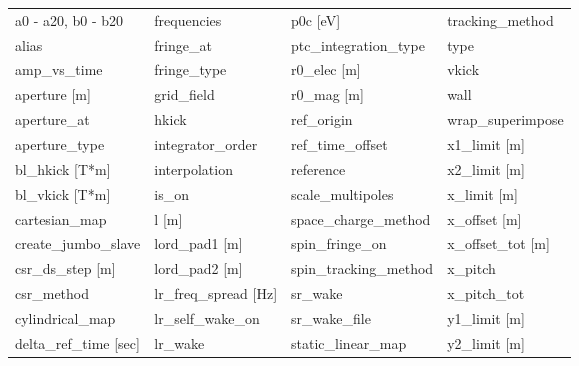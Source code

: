  \begin{tabular}{llll} \toprule
a0 - a20, b0 - b20               & frequencies                      & p0c [eV]                         & tracking_method                  \\
alias                            & fringe_at                        & ptc_integration_type             & type                             \\
amp_vs_time                      & fringe_type                      & r0_elec [m]                      & vkick                            \\
aperture [m]                     & grid_field                       & r0_mag [m]                       & wall                             \\
aperture_at                      & hkick                            & ref_origin                       & wrap_superimpose                 \\
aperture_type                    & integrator_order                 & ref_time_offset                  & x1_limit [m]                     \\
bl_hkick [T*m]                   & interpolation                    & reference                        & x2_limit [m]                     \\
bl_vkick [T*m]                   & is_on                            & scale_multipoles                 & x_limit [m]                      \\
cartesian_map                    & l [m]                            & space_charge_method              & x_offset [m]                     \\
create_jumbo_slave               & lord_pad1 [m]                    & spin_fringe_on                   & x_offset_tot [m]                 \\
csr_ds_step [m]                  & lord_pad2 [m]                    & spin_tracking_method             & x_pitch                          \\
csr_method                       & lr_freq_spread [Hz]              & sr_wake                          & x_pitch_tot                      \\
cylindrical_map                  & lr_self_wake_on                  & sr_wake_file                     & y1_limit [m]                     \\
delta_ref_time [sec]             & lr_wake                          & static_linear_map                & y2_limit [m]                     \\

\end{tabular}
